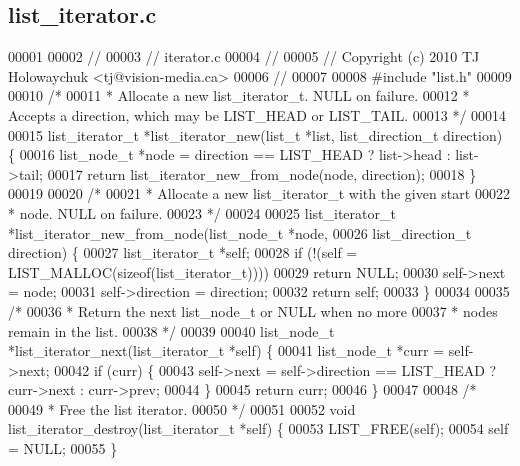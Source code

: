 \subsection{list\+\_\+iterator.\+c}
\label{list__iterator_8c_source}

\begin{DoxyCode}
00001 
00002 \textcolor{comment}{//}
00003 \textcolor{comment}{// iterator.c}
00004 \textcolor{comment}{//}
00005 \textcolor{comment}{// Copyright (c) 2010 TJ Holowaychuk <tj@vision-media.ca>}
00006 \textcolor{comment}{//}
00007 
00008 \textcolor{preprocessor}{#include "list.h"}
00009 
00010 \textcolor{comment}{/*}
00011 \textcolor{comment}{ * Allocate a new list\_iterator\_t. NULL on failure.}
00012 \textcolor{comment}{ * Accepts a direction, which may be LIST\_HEAD or LIST\_TAIL.}
00013 \textcolor{comment}{ */}
00014 
00015 list_iterator_t *list_iterator_new(list_t *list, list_direction_t direction) \{
00016   list_node_t *node = direction == LIST_HEAD ? list->head : list->tail;
00017   \textcolor{keywordflow}{return} list_iterator_new_from_node(node, direction);
00018 \}
00019 
00020 \textcolor{comment}{/*}
00021 \textcolor{comment}{ * Allocate a new list\_iterator\_t with the given start}
00022 \textcolor{comment}{ * node. NULL on failure.}
00023 \textcolor{comment}{ */}
00024 
00025 list_iterator_t *list_iterator_new_from_node(list_node_t *node,
00026                                              list_direction_t direction) \{
00027   list_iterator_t *\textcolor{keyword}{self};
00028   \textcolor{keywordflow}{if} (!(\textcolor{keyword}{self} = LIST_MALLOC(\textcolor{keyword}{sizeof}(list_iterator_t))))
00029     \textcolor{keywordflow}{return} NULL;
00030   \textcolor{keyword}{self}->next = node;
00031   \textcolor{keyword}{self}->direction = direction;
00032   \textcolor{keywordflow}{return} \textcolor{keyword}{self};
00033 \}
00034 
00035 \textcolor{comment}{/*}
00036 \textcolor{comment}{ * Return the next list\_node\_t or NULL when no more}
00037 \textcolor{comment}{ * nodes remain in the list.}
00038 \textcolor{comment}{ */}
00039 
00040 list_node_t *list_iterator_next(list_iterator_t *\textcolor{keyword}{self}) \{
00041   list_node_t *curr = \textcolor{keyword}{self}->next;
00042   \textcolor{keywordflow}{if} (curr) \{
00043     \textcolor{keyword}{self}->next = \textcolor{keyword}{self}->direction == LIST_HEAD ? curr->next : curr->prev;
00044   \}
00045   \textcolor{keywordflow}{return} curr;
00046 \}
00047 
00048 \textcolor{comment}{/*}
00049 \textcolor{comment}{ * Free the list iterator.}
00050 \textcolor{comment}{ */}
00051 
00052 \textcolor{keywordtype}{void} list_iterator_destroy(list_iterator_t *\textcolor{keyword}{self}) \{
00053   LIST_FREE(\textcolor{keyword}{self});
00054   \textcolor{keyword}{self} = NULL;
00055 \}
\end{DoxyCode}
